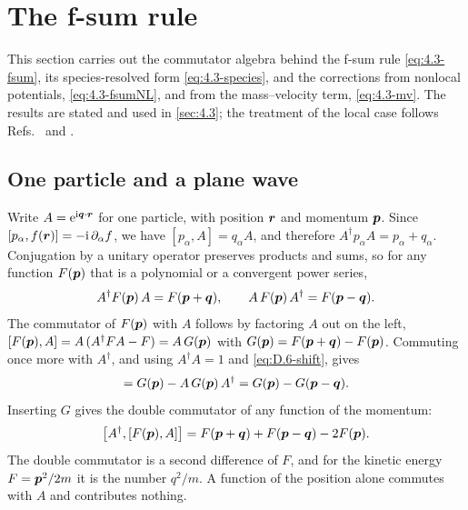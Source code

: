 \section{The f-sum rule}\label{app:D.6}

This section carries out the commutator algebra behind the f-sum rule \cref{eq:4.3-fsum}, its species-resolved form \cref{eq:4.3-species}, and the corrections from nonlocal potentials, \cref{eq:4.3-fsumNL}, and from the mass--velocity term, \cref{eq:4.3-mv}. The results are stated and used in \cref{sec:4.3}; the treatment of the local case follows Refs.~\cite[Sect.~3.4]{giuliani2005quantum} and \cite[Chap.~2]{pines1966theory}.

\subsection*{One particle and a plane wave}

Write $A = \mathrm{e}^{\mathrm{i}\bm{q}\cdot\bm{r}}$ for one particle, with position $\bm{r}$ and momentum $\bm{p}$. Since $[p_\alpha, f(\bm{r})] = -\mathrm{i}\,\partial_\alpha f$, we have $[p_\alpha, A] = q_\alpha A$, and therefore $A^\dagger p_\alpha A = p_\alpha + q_\alpha$. Conjugation by a unitary operator preserves products and sums, so for any function $F(\bm{p})$ that is a polynomial or a convergent power series,
\begin{equation}
  A^\dagger F(\bm{p})\,A = F(\bm{p} + \bm{q}), \qquad A\,F(\bm{p})\,A^\dagger = F(\bm{p} - \bm{q}) .
  \label{eq:D.6-shift}
\end{equation}
The commutator of $F(\bm{p})$ with $A$ follows by factoring $A$ out on the left, $[F(\bm{p}), A] = A\,(A^\dagger FA - F) = A\,G(\bm{p})$ with $G(\bm{p}) = F(\bm{p} + \bm{q}) - F(\bm{p})$. Commuting once more with $A^\dagger$, and using $A^\dagger A = 1$ and \cref{eq:D.6-shift}, gives
\begin{equation*}
  [A^\dagger, A\,G(\vect{p})] = G(\vect{p}) - A\,G(\vect{p})\,A^\dagger = G(\vect{p}) - G(\vect{p} - \vect{q}) .
\end{equation*}
Inserting $G$ gives the double commutator of any function of the momentum:
\begin{equation}
  \bigl[A^\dagger, [F(\bm{p}), A]\bigr] = F(\bm{p} + \bm{q}) + F(\bm{p} - \bm{q}) - 2F(\bm{p}) .
  \label{eq:D.6-dc}
\end{equation}
The double commutator is a second difference of $F$, and for the kinetic energy $F = \bm{p}^2/2m$ it is the number $q^2/m$. A function of the position alone commutes with $A$ and contributes nothing.

